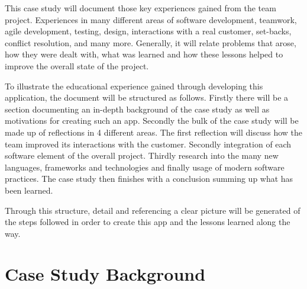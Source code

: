\documentclass{l3proj}
\begin{document}


This case study will document those key experiences gained from the team project.  Experiences in many different areas of software development, teamwork, agile development, testing, design, interactions with a real customer, set-backs, conflict resolution, and many more.  Generally, it will relate problems that arose, how they were dealt with, what was learned and how these lessons helped to improve the overall state of the project.\par

To illustrate the educational experience gained through developing this application, the document will be structured as follows.  Firstly there will be a section documenting an in-depth background of the case study as well as motivations for creating such an app.  Secondly the bulk of the case study will be made up of reflections in 4 different areas.  The first reflection will discuss how the team improved its interactions with the customer.  Secondly integration of each software element of the overall project.  Thirdly research into the many new languages, frameworks and technologies and finally usage of modern software practices.  The case study then finishes with a conclusion summing up what has been learned.

Through this structure, detail and referencing a clear picture will be generated of the steps followed in order to create this app and the lessons learned along the way. 

\section{Case Study Background}
\end{document}
